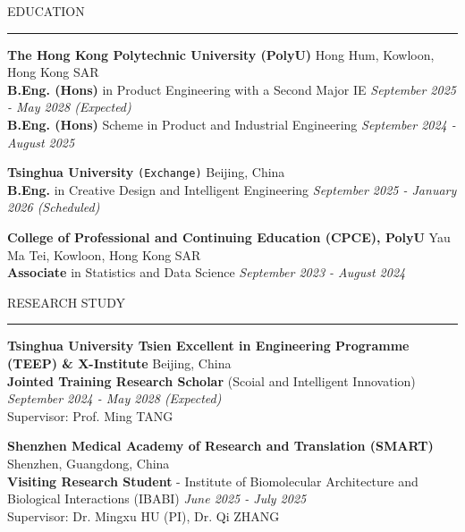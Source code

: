 \documentclass{resume} %
\renewenvironment{rSection}[1]{
\sectionskip
\textcolor{TsinghuaPurple}{\MakeUppercase{#1}}
\sectionlineskip
\hrule
\begin{list}{}{
\setlength{\leftmargin}{0em}
}
\item[]
}{
\end{list}
}
\begin{document}
  


\begin{rSection}{Education}
{\bf The Hong Kong Polytechnic University (PolyU)} \hfill {Hong Hum, Kowloon, Hong Kong SAR}\\
{\textbf{B.Eng. (Hons)} in Product Engineering with a Second Major IE} \hfill \textit{September 2025 - May 2028 (Expected)}\\
{\textbf{B.Eng. (Hons)} Scheme in Product and Industrial Engineering} \hfill \textit{September 2024 - August 2025}

{\bf Tsinghua University} \texttt{(Exchange)} \hfill {Beijing, China}\\
{\textbf {B.Eng.} in Creative Design and Intelligent Engineering} \hfill \textit{September 2025 - January 2026 (Scheduled)}

{\bf College of Professional and Continuing Education (CPCE), PolyU} \hfill {Yau Ma Tei, Kowloon, Hong Kong SAR}\\
{\textbf{Associate} in Statistics and Data Science} \hfill \textit{September 2023 - August 2024}
\end{rSection} 

\begin{rSection}{Research Study}
{\bf Tsinghua University Tsien Excellent in Engineering Programme (TEEP) \& X-Institute} \hfill {Beijing, China}\\
{\textbf{Jointed Training Research Scholar} (Scoial and Intelligent Innovation)} \hfill \textit{September 2024 - May 2028 (Expected)}\\
{Supervisor: Prof. Ming TANG}

{\bf Shenzhen Medical Academy of Research and Translation (SMART)} \hfill {Shenzhen, Guangdong, China}\\
{\textbf{Visiting Research Student} - Institute of Biomolecular Architecture and Biological Interactions (IBABI)} \hfill \textit{June 2025 - July 2025}\\
{Supervisor: Dr. Mingxu HU (PI), Dr. Qi ZHANG}
\end{rSection}  
\end{document}
